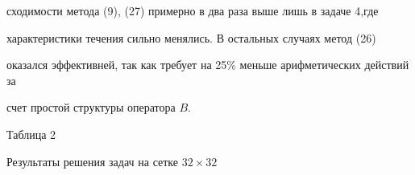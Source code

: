 сходимости метода (9), (27) примерно в два раза выше лишь в задаче 4,где 


характеристики течения сильно менялись. В остальных случаях метод (26) 


оказался эффективней, так как требует на 25\% меньше арифметических действий за 


счет простой структуры оператора $B.$ 


\medskip 







{\hfill Таблица 2\hfill} 


 


{\hfill Результаты решения задач на сетке $32\times 32$ \hfill} 





\par


\bigskip



